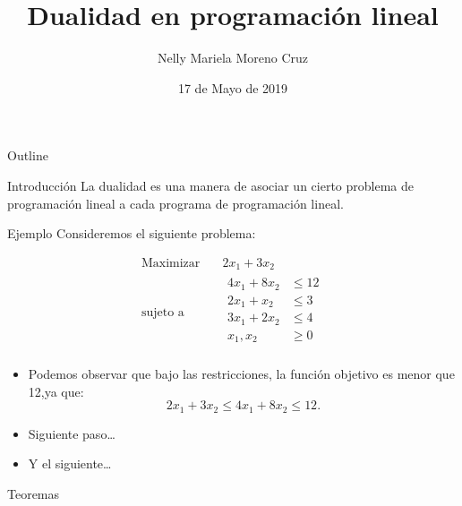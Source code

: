 \documentclass[presentation]{beamer}
\author{Nelly Mariela Moreno Cruz}
\date{17 de Mayo de 2019}
\title{Dualidad en programación lineal}
\begin{document}
\maketitle
\begin{frame}{Outline}
\tableofcontents
\end{frame}


\begin{frame}[label={sec:org9a15af3}]{Introducción}
La dualidad es una manera de asociar un cierto problema de
programación lineal a cada programa de programación lineal.
\end{frame}

\begin{frame}[label={sec:org5cae392}]{Ejemplo}
Consideremos el siguiente problema:

\begin{equation*}
\begin{aligned}
\text{Maximizar} \quad & 2x_{1}+3x_{2}\\
\text{sujeto a} \quad &
  \begin{aligned}
   4x_{1}+8x_{2} &\leq 12\\
   2x_{1}+x_{2} &\leq 3\\
   3x_{1}+2x_{2} &\leq 4\\
   x_{1},x_{2} &\geq  0\\
  \end{aligned}
\end{aligned}
\end{equation*}
\begin{itemize}
\item Podemos observar que bajo las restricciones, la función objetivo
es menor que 12,ya que:
\begin{equation}
\label{eq:1}
2x_{1}+3x_{2}\leq 4x_{1}+8x_{2}\leq 12.
\end{equation}
\item Siguiente paso\ldots{}
\item Y el siguiente\ldots{}
\end{itemize}
\end{frame}


\begin{frame}[label={sec:org25f1987}]{Teoremas}
\end{frame}
\end{document}
